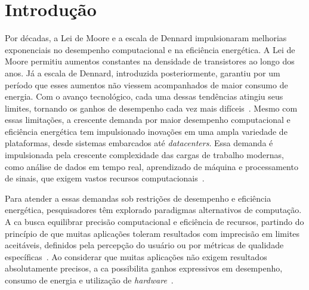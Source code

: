 \chapter{Introdução}\label{cap:introducao}

Por décadas, a Lei de Moore e a escala de Dennard impulsionaram melhorias exponenciais no desempenho computacional e na eficiência energética. A Lei de Moore permitiu aumentos constantes na densidade de transistores ao longo dos anos. Já a escala de Dennard, introduzida posteriormente, garantiu por um período que esses aumentos não viessem acompanhados de maior consumo de energia. Com o avanço tecnológico, cada uma dessas tendências atingiu seus limites, tornando os ganhos de desempenho cada vez mais difíceis~\cite{hennessy2019}. Mesmo com essas limitações, a crescente demanda por maior desempenho computacional e eficiência energética tem impulsionado inovações em uma ampla variedade de plataformas, desde sistemas embarcados até \textit{datacenters}. Essa demanda é impulsionada pela crescente complexidade das cargas de trabalho modernas, como análise de dados em tempo real, aprendizado de máquina e processamento de sinais, que exigem vastos recursos computacionais~\cite{mittal2016, dalloo2024}.

Para atender a essas demandas sob restrições de desempenho e eficiência energética, pesquisadores têm explorado paradigmas alternativos de computação. A \gls{ca} busca equilibrar precisão computacional e eficiência de recursos, partindo do princípio de que muitas aplicações toleram resultados com imprecisão em limites aceitáveis, definidos pela percepção do usuário ou por métricas de qualidade específicas~\cite{dalloo2024}. Ao considerar que muitas aplicações não exigem resultados absolutamente precisos, a \gls{ca} possibilita ganhos expressivos em desempenho, consumo de energia e utilização de \textit{hardware}~\cite{xu2016,leon2025b,leon2025a}.

